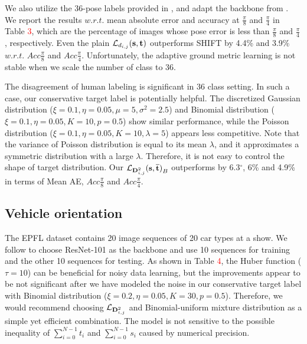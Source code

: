 We also utilize the 36-pose labels provided in \cite{hara2017growing,hara2017designing}, and adapt the backbone from \cite{hara2017designing}. We report the results $w.r.t.$ mean absolute error and accuracy at $\frac{\pi}{8}$ and $\frac{\pi}{4}$ in Table \textcolor{red}{3}, which are the percentage of images whose pose error is less than $\frac{\pi}{8}$ and $\frac{\pi}{4}$, respectively. Even the plain $\mathcal{L}_{d_{i,j}}(\rm{\textbf{s},{\textbf{t}}})$ outperforms SHIFT \cite{hara2017designing} by 4.4\% and 3.9\% $w.r.t.$ $Acc\frac{\pi}{8}$ and $Acc\frac{\pi}{4}$. Unfortunately, the adaptive ground metric learning is not stable when we scale the number of class to 36. 

The disagreement of human labeling is significant in 36 class setting. In such a case, our conservative target label is potentially helpful. The discretized Gaussian distribution ($\xi=0.1,\eta=0.05,\mu=5,\sigma^2=2.5$) and Binomial distribution ($\xi=0.1,\eta=0.05,K=10,p=0.5$) show similar performance, while the Poisson distribution ($\xi=0.1,\eta=0.05,K=10,\lambda=5$) appears less competitive. Note that the variance of Poisson distribution is equal to its mean $\lambda$, and it approximates a symmetric distribution with a large $\lambda$. Therefore, it is not easy to control the shape of target distribution. Our $\small \mathcal{L}_{{\rm\textbf{D}}_{i,j}^2}{(\rm{{\textbf{s},\overline{\textbf{t}}}})}_B$ outperforms \cite{hara2017designing} by 6.3$^\circ$, 6\% and 4.9\% in terms of Mean AE, $Acc\frac{\pi}{8}$ and $Acc\frac{\pi}{4}$.  







\subsection{Vehicle orientation}

The EPFL dataset \cite{ozuysal2009pose} contains 20 image sequences of 20 car types at a show. We follow \cite{hara2017designing} to choose ResNet-101 \cite{he2016deep} as the backbone and use 10 sequences for training and the other 10 sequences for testing. As shown in Table \textcolor{red}{4}, the Huber function ($\tau=10$) can be beneficial for noisy data learning, but the improvements appear to be not significant after we have modeled the noise in our conservative target label with Binomial distribution ($\xi=0.2,\eta=0.05,K=30,p=0.5$). Therefore, we would recommend choosing $\mathcal{L}_{{\rm\textbf{D}}_{i,j}^2}$ and Binomial-uniform mixture distribution as a simple yet efficient combination. The model is not sensitive to the possible inequality of $\sum_{i=0}^{N-1}t_i$ and $\sum_{i=0}^{N-1}s_i$ caused by numerical precision.     


